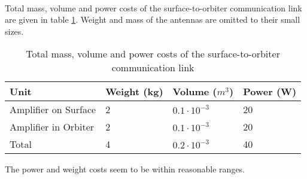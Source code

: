\\
Total mass, volume and power costs of the surface-to-orbiter communication link are given in table \ref{tab:commsurf}. Weight and mass of the antennas are omitted to their small sizes.
\begin{table}[htb]
\centering

\label{my-label}
\begin{tabular}{|l|l|l|l|}
\hline
\textbf{Unit}        & \textbf{Weight (kg)} & \textbf{Volume ($m^{3}$)} & \textbf{Power (W)} \\ \hline
Amplifier on Surface & 2                    & $0.1\cdot 10^{-3}$        & 20                 \\ \hline
Amplifier in Orbiter & 2                    & $0.1\cdot 10^{-3}$        & 20                 \\ \hline
\hline
Total                & 4                    & $0.2\cdot 10^{-3}$        & 40                 \\ \hline
\end{tabular}
\caption{Total mass, volume and power costs of the surface-to-orbiter communication link}
\label{tab:commsurf}
\end{table}
The power and weight costs seem to be within reasonable ranges. 

\iffalse
1. Introduction and considerations for the link
      * (Orbit characteristics and Europa Environment)
1. Link Drivers
   1. Radiation (Europa surf dead zone)
   2. Low Power
   3. Transmission Relay Window
      * Dataload
      * Bitrate
   1. Low Temperature Operation
   2. Line of Sight (viewing angles)
      * Communication while descent maneuver
      * Antenna choice
      * Mechanical stabilizers
1. Link Budget
2. Solution Proposal
3. Drivers to other systems
\fi